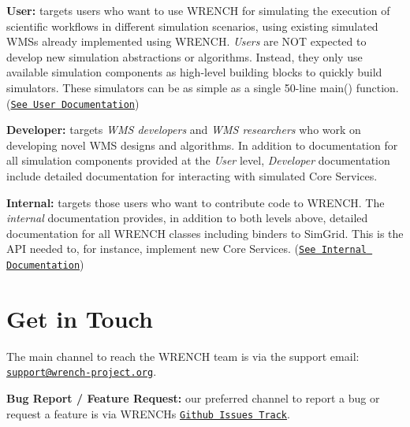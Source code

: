 {\bfseries User\+:} targets users who want to use W\+R\+E\+N\+CH for simulating the execution of scientific workflows in different simulation scenarios, using existing simulated W\+M\+Ss already implemented using W\+R\+E\+N\+CH. {\itshape Users} are N\+OT expected to develop new simulation abstractions or algorithms. Instead, they only use available simulation components as high-\/level building blocks to quickly build simulators. These simulators can be as simple as a single 50-\/line main() function. (\href{../user/index.html}{\tt See User Documentation})

{\bfseries Developer\+:} targets {\itshape W\+MS developers} and {\itshape W\+MS researchers} who work on developing novel W\+MS designs and algorithms. In addition to documentation for all simulation components provided at the {\itshape User} level, {\itshape Developer} documentation include detailed documentation for interacting with simulated Core Services.

{\bfseries Internal\+:} targets those users who want to contribute code to W\+R\+E\+N\+CH. The {\itshape internal} documentation provides, in addition to both levels above, detailed documentation for all W\+R\+E\+N\+CH classes including binders to Sim\+Grid. This is the A\+PI needed to, for instance, implement new Core Services. (\href{../internal/index.html}{\tt See Internal Documentation})\hypertarget{index_overview-contact}{}\section{Get in Touch}\label{index_overview-contact}
The main channel to reach the W\+R\+E\+N\+CH team is via the support email\+: \href{mailto:support@wrench-project.org?subject=WRENCH Support Contact: Your Topic}{\tt support@wrench-\/project.\+org}.

{\bfseries Bug Report / Feature Request\+:} our preferred channel to report a bug or request a feature is via W\+R\+E\+N\+CH\textquotesingle{}s \href{https://github.com/wrench-project/wrench/issues}{\tt Github Issues Track}. 